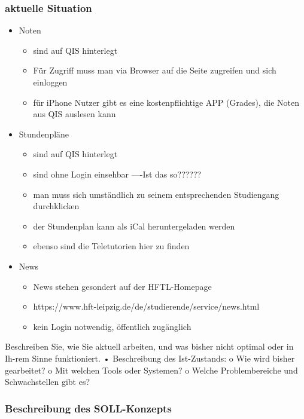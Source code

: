 \subsubsection{aktuelle Situation}

   \begin{itemize}
      \item Noten
      \begin{itemize}
         \item sind auf QIS hinterlegt
         \item Für Zugriff muss man via Browser auf die Seite zugreifen und sich einloggen
         \item für iPhone Nutzer gibt es eine kostenpflichtige APP (Grades), die Noten aus QIS auslesen kann
      \end{itemize}
      \item Stundenpläne
      \begin{itemize}
      	\item sind auf QIS hinterlegt
      	\item sind ohne Login einsehbar ----Ist das so??????
      	\item man muss sich umständlich zu seinem entsprechenden Studiengang durchklicken
      	\item der Stundenplan kann als iCal heruntergeladen werden
      	\item ebenso sind die Teletutorien hier zu finden
      \end{itemize}
      \item News
      \begin{itemize}
      	\item News stehen gesondert auf der HFTL-Homepage
      	\item https://www.hft-leipzig.de/de/studierende/service/news.html
      	\item kein Login notwendig, öffentlich zugänglich
      \end{itemize}
   \end{itemize}

Beschreiben Sie, wie Sie aktuell arbeiten, und was bisher nicht optimal oder in Ih-rem Sinne funktioniert. 
•	Beschreibung des Ist-Zustands: 
o	Wie wird bisher gearbeitet?
o	Mit welchen Tools oder Systemen?
o	Welche Problembereiche und Schwachstellen gibt es?

\subsubsection{Beschreibung des SOLL-Konzepts}

